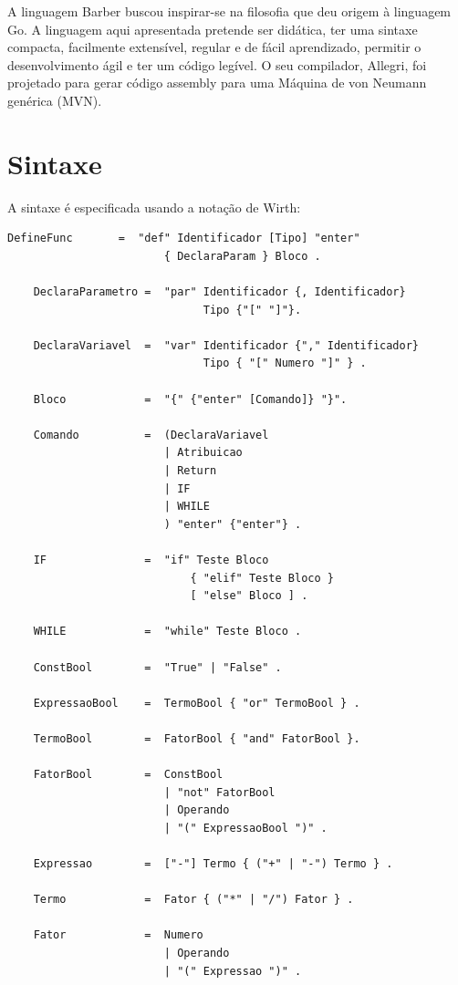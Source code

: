 \documentclass[a4paper,12pt]{report}
\begin{document}
    A linguagem Barber buscou inspirar-se na filosofia que deu origem à linguagem Go. A linguagem aqui apresentada pretende ser didática, ter uma sintaxe compacta, facilmente extensível, regular e de fácil aprendizado, permitir o desenvolvimento ágil e ter um código legível. O seu compilador, Allegri, foi projetado para gerar código assembly para uma Máquina de von Neumann genérica (MVN).

    \newpage
    \section*{Sintaxe}
    A sintaxe é especificada usando a notação de Wirth:
    \begin{lstlisting}[numbers=none,frame=none]
    DefineFunc       =  "def" Identificador [Tipo] "enter"
                        { DeclaraParam } Bloco .

    DeclaraParametro =  "par" Identificador {, Identificador}
                              Tipo {"[" "]"}.

    DeclaraVariavel  =  "var" Identificador {"," Identificador}
                              Tipo { "[" Numero "]" } .

    Bloco            =  "{" {"enter" [Comando]} "}".

    Comando          =  (DeclaraVariavel
                        | Atribuicao
                        | Return
                        | IF
                        | WHILE
                        ) "enter" {"enter"} .

    IF               =  "if" Teste Bloco
                            { "elif" Teste Bloco }
                            [ "else" Bloco ] .

    WHILE            =  "while" Teste Bloco .

    ConstBool        =  "True" | "False" .

    ExpressaoBool    =  TermoBool { "or" TermoBool } .

    TermoBool        =  FatorBool { "and" FatorBool }.

    FatorBool        =  ConstBool
                        | "not" FatorBool
                        | Operando
                        | "(" ExpressaoBool ")" .

    Expressao        =  ["-"] Termo { ("+" | "-") Termo } .

    Termo            =  Fator { ("*" | "/") Fator } .

    Fator            =  Numero
                        | Operando
                        | "(" Expressao ")" .


\end{lstlisting}
\end{document}
